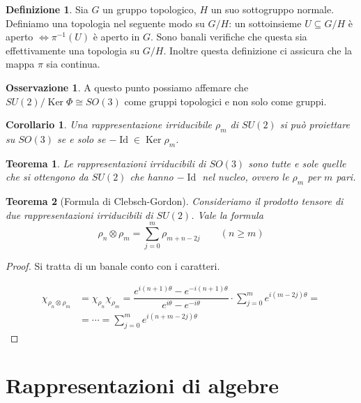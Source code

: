 \documentclass[11pt]{article}
\theoremstyle{plain}
\newtheorem{thm}{Teorema}[section]
\newtheorem*{cor}{Corollario}
\theoremstyle{definition}
\newtheorem{defn}{Definizione}[section]
\newtheorem*{rem}{Osservazione}
\theoremstyle{remark}
\newcommand{\dsum}{\displaystyle\sum}
\DeclareMathOperator{\Ker}{Ker}
\DeclareMathOperator{\Id}{Id}
\begin{document}
   \begin{defn}
     Sia $G$ un gruppo topologico, $H$ un suo sottogruppo normale. Definiamo una topologia nel seguente modo su $G/H$: un sottoinsieme $U \subseteq G/H$ è aperto $\Leftrightarrow \pi^{-1}(U)$ è aperto in $G$. Sono banali verifiche che questa sia effettivamente una topologia su $G/H$. Inoltre questa definizione ci assicura che la mappa $\pi$ sia continua.
   \end{defn}

   \begin{rem}
     A questo punto possiamo affemare che $SU(2) / \Ker\Phi \cong SO(3)$ come gruppi topologici e non solo come gruppi.
   \end{rem}



   \begin{cor}
     Una rappresentazione irriducibile $\rho_m$ di $SU(2)$ si può proiettare su $SO(3)$ se e solo se $- \Id \in \Ker \rho_m$.
   \end{cor}


   \begin{thm}
     Le rappresentazioni irriducibili di $SO(3)$ sono tutte e sole quelle che si ottengono da $SU(2)$ che hanno $-\Id$ nel nucleo, ovvero le $\rho_m$ per $m$ pari.
   \end{thm}


   \begin{thm}[Formula di Clebsch-Gordon]
     Consideriamo il prodotto tensore di due rappresentazioni irriducibili di $SU(2)$. Vale la formula
     \[ \rho_n\otimes \rho_m = \dsum_{j=0}^m \rho_{m+n-2j} \qquad (n \geq m)\]
   \end{thm}

   \begin{proof}
     Si tratta di un banale conto con i caratteri.

     \begin{align*}
       \chi_{\rho_n\otimes\rho_m} &= \chi_{\rho_n} \chi_{\rho_m} = \dfrac{e^{i(n+1)\theta} - e^{-i(n+1)\theta}}{e^{i\theta} - e^{-i\theta}} \cdot \dsum_{j=0}^m e^{i(m-2j)\theta} =\\
                                  &= \cdots = \dsum_{j = 0}^m e^{i(n+m-2j)\theta}
     \end{align*}
   \end{proof}




\newpage
\section{Rappresentazioni di algebre}
\end{document}
